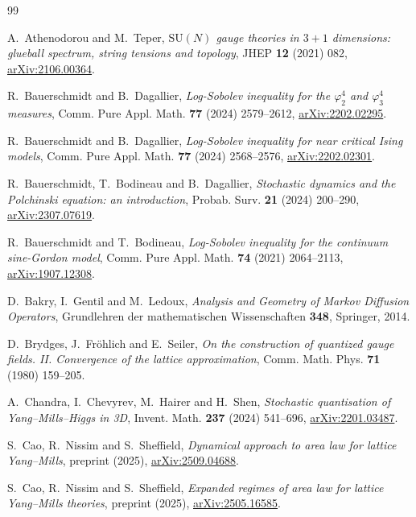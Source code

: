 \documentclass[11pt,reqno]{amsart}
\theoremstyle{plain}
\theoremstyle{definition}
\theoremstyle{remark}
\begin{document}
\begin{thebibliography}{99}

 A.~Athenodorou and M.~Teper, \emph{$\mathrm{SU}(N)$ gauge theories in $3+1$ dimensions: glueball spectrum, string tensions and topology}, JHEP \textbf{12} (2021) 082, \href{https://arxiv.org/abs/2106.00364}{arXiv:2106.00364}.

 R.~Bauerschmidt and B.~Dagallier, \emph{Log-Sobolev inequality for the $\varphi^4_2$ and $\varphi^4_3$ measures}, Comm. Pure Appl. Math. \textbf{77} (2024) 2579--2612, \href{https://arxiv.org/abs/2202.02295}{arXiv:2202.02295}.

 R.~Bauerschmidt and B.~Dagallier, \emph{Log-Sobolev inequality for near critical Ising models}, Comm. Pure Appl. Math. \textbf{77} (2024) 2568--2576, \href{https://arxiv.org/abs/2202.02301}{arXiv:2202.02301}.

 R.~Bauerschmidt, T.~Bodineau and B.~Dagallier, \emph{Stochastic dynamics and the Polchinski equation: an introduction}, Probab. Surv. \textbf{21} (2024) 200--290, \href{https://arxiv.org/abs/2307.07619}{arXiv:2307.07619}.

 R.~Bauerschmidt and T.~Bodineau, \emph{Log-Sobolev inequality for the continuum sine-Gordon model}, Comm. Pure Appl. Math. \textbf{74} (2021) 2064--2113, \href{https://arxiv.org/abs/1907.12308}{arXiv:1907.12308}.

 D.~Bakry, I.~Gentil and M.~Ledoux, \emph{Analysis and Geometry of Markov Diffusion Operators}, Grundlehren der mathematischen Wissenschaften \textbf{348}, Springer, 2014.

 D.~Brydges, J.~Fr\"ohlich and E.~Seiler, \emph{On the construction of quantized gauge fields. II. Convergence of the lattice approximation}, Comm. Math. Phys. \textbf{71} (1980) 159--205.

 A.~Chandra, I.~Chevyrev, M.~Hairer and H.~Shen, \emph{Stochastic quantisation of Yang--Mills--Higgs in 3D}, Invent. Math. \textbf{237} (2024) 541--696, \href{https://arxiv.org/abs/2201.03487}{arXiv:2201.03487}.

 S.~Cao, R.~Nissim and S.~Sheffield, \emph{Dynamical approach to area law for lattice Yang--Mills}, preprint (2025), \href{https://arxiv.org/abs/2509.04688}{arXiv:2509.04688}.

 S.~Cao, R.~Nissim and S.~Sheffield, \emph{Expanded regimes of area law for lattice Yang--Mills theories}, preprint (2025), \href{https://arxiv.org/abs/2505.16585}{arXiv:2505.16585}.


\end{thebibliography}
\end{document}
